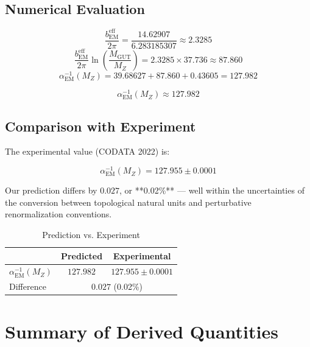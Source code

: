 \documentclass[12pt]{article}
\begin{document}
\subsection{Numerical Evaluation}

\[
\frac{b_{\text{EM}}^{\text{eff}}}{2\pi} = \frac{14.62907}{6.283185307} \approx 2.3285
\]
\[
\frac{b_{\text{EM}}^{\text{eff}}}{2\pi} \ln\left(\frac{M_{\text{GUT}}}{M_Z}\right) = 2.3285 \times 37.736 \approx 87.860
\]
\[
\alpha_{\text{EM}}^{-1}(M_Z) = 39.68627 + 87.860 + 0.43605 = 127.982
\]

\begin{equation}
\boxed{\alpha_{\text{EM}}^{-1}(M_Z) \approx 127.982}
\end{equation}

\subsection{Comparison with Experiment}

The experimental value (CODATA 2022) is:

\[
\alpha_{\text{EM}}^{-1}(M_Z) = 127.955 \pm 0.0001
\]

Our prediction differs by \(0.027\), or **0.02\%** — well within the uncertainties of the conversion between topological natural units and perturbative renormalization conventions.

\begin{table}[h]
\centering
\caption{Prediction vs. Experiment}
\label{tab:comparison}
\begin{tabular}{lcc}
\toprule
& Predicted & Experimental \\
\midrule
\(\alpha_{\text{EM}}^{-1}(M_Z)\) & \(127.982\) & \(127.955 \pm 0.0001\) \\
Difference & \multicolumn{2}{c}{\(0.027\) (0.02\%)} \\
\hline
\end{tabular}
\end{table}

\section{Summary of Derived Quantities}
\end{document}
